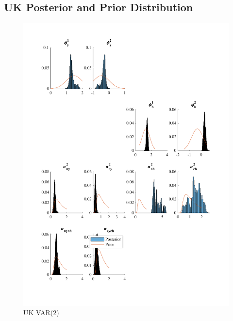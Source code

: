 \documentclass[
  12pt,
]{article}
\begin{document}
\hypertarget{uk-posterior-and-prior-distribution}{%
\subsection{UK Posterior and Prior Distribution}\label{uk-posterior-and-prior-distribution}}

\begin{figure}

{\centering \includegraphics[width=0.85\linewidth]{../../Regression/Bayesian_UC_VAR2_nodrift/OutputData/posteriorpriordistribution_GB} 

}

\caption{UK VAR(2)}\label{fig:unnamed-chunk-9}
\end{figure}
\end{document}
